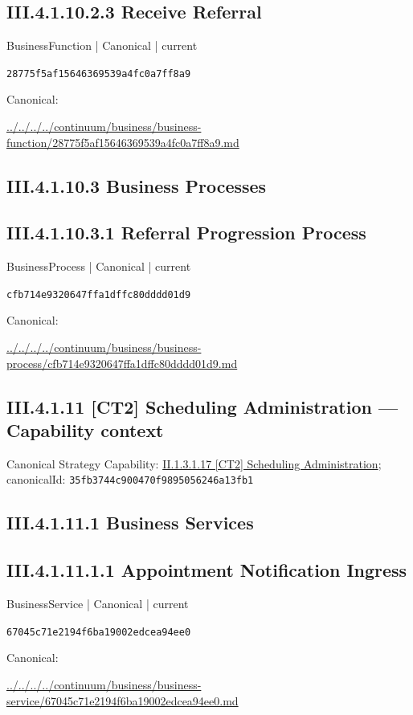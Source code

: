 \documentclass[10pt,a4paper]{article}
\begin{document}
\subsection*{III.4.1.10.2.3 Receive Referral}
\label{element-28775f5af15646369539a4fc0a7ff8a9}
{\small BusinessFunction | Canonical | current}\par
\texttt{28775f5af15646369539a4fc0a7ff8a9}\par
Canonical: \par
{\footnotesize\url{../../../../continuum/business/business-function/28775f5af15646369539a4fc0a7ff8a9.md}}\par
\subsection*{III.4.1.10.3 Business Processes}
\subsection*{III.4.1.10.3.1 Referral Progression Process}
\label{element-cfb714e9320647ffa1dffc80dddd01d9}
{\small BusinessProcess | Canonical | current}\par
\texttt{cfb714e9320647ffa1dffc80dddd01d9}\par
Canonical: \par
{\footnotesize\url{../../../../continuum/business/business-process/cfb714e9320647ffa1dffc80dddd01d9.md}}\par
\subsection*{III.4.1.11 [CT2] Scheduling Administration — Capability context}
Canonical Strategy Capability: \hyperref[element-35fb3744c900470f9895056246a13fb1]{II.1.3.1.17 [CT2] Scheduling Administration}; canonicalId: \texttt{35fb3744c900470f9895056246a13fb1}\par
\subsection*{III.4.1.11.1 Business Services}
\subsection*{III.4.1.11.1.1 Appointment Notification Ingress}
\label{element-67045c71e2194f6ba19002edcea94ee0}
{\small BusinessService | Canonical | current}\par
\texttt{67045c71e2194f6ba19002edcea94ee0}\par
Canonical: \par
{\footnotesize\url{../../../../continuum/business/business-service/67045c71e2194f6ba19002edcea94ee0.md}}\par
\end{document}
